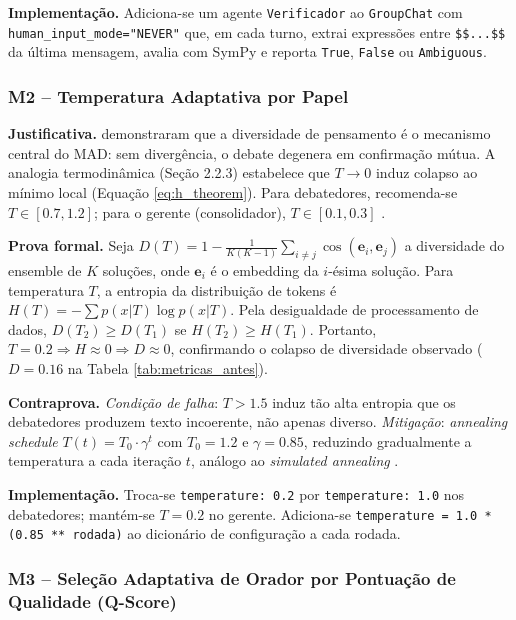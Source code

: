 \documentclass[5p]{elsarticle}
\theoremstyle{remark}
\begin{document}
\textbf{Implementação.} Adiciona-se um agente \texttt{Verificador} ao \texttt{GroupChat} com \texttt{human\_input\_mode="NEVER"} que, em cada turno, extrai expressões entre \texttt{\$\$...\$\$} da última mensagem, avalia com SymPy e reporta \texttt{True}, \texttt{False} ou \texttt{Ambiguous}.

\subsubsection{M2 -- Temperatura Adaptativa por Papel}

\textbf{Justificativa.} \cite{Liang2023MAD} demonstraram que a diversidade de pensamento é o mecanismo central do MAD: sem divergência, o debate degenera em confirmação mútua. A analogia termodinâmica (Seção 2.2.3) estabelece que $T \to 0$ induz colapso ao mínimo local (Equação \ref{eq:h_theorem}). Para debatedores, recomenda-se $T \in [0.7, 1.2]$; para o gerente (consolidador), $T \in [0.1, 0.3]$ \cite{Liu2024Decoding}.

\textbf{Prova formal.} Seja $D(T) = 1 - \frac{1}{K(K-1)}\sum_{i \neq j} \cos(\mathbf{e}_i, \mathbf{e}_j)$ a diversidade do ensemble de $K$ soluções, onde $\mathbf{e}_i$ é o embedding da $i$-ésima solução. Para temperatura $T$, a entropia da distribuição de tokens é $H(T) = -\sum p(x|T) \log p(x|T)$. Pela desigualdade de processamento de dados, $D(T_2) \geq D(T_1)$ se $H(T_2) \geq H(T_1)$. Portanto, $T = 0.2 \Rightarrow H \approx 0 \Rightarrow D \approx 0$, confirmando o colapso de diversidade observado ($D = 0.16$ na Tabela \ref{tab:metricas_antes}).

\textbf{Contraprova.} \textit{Condição de falha}: $T > 1.5$ induz tão alta entropia que os debatedores produzem texto incoerente, não apenas diverso. \textit{Mitigação}: \textit{annealing schedule} $T(t) = T_0 \cdot \gamma^t$ com $T_0 = 1.2$ e $\gamma = 0.85$, reduzindo gradualmente a temperatura a cada iteração $t$, análogo ao \textit{simulated annealing} \cite{Kirkpatrick1983Optimization}.

\textbf{Implementação.} Troca-se \texttt{temperature: 0.2} por \texttt{temperature: 1.0} nos debatedores; mantém-se $T = 0.2$ no gerente. Adiciona-se \texttt{temperature = 1.0 * (0.85 ** rodada)} ao dicionário de configuração a cada rodada.

\subsubsection{M3 -- Seleção Adaptativa de Orador por Pontuação de Qualidade (Q-Score)}
\end{document}
